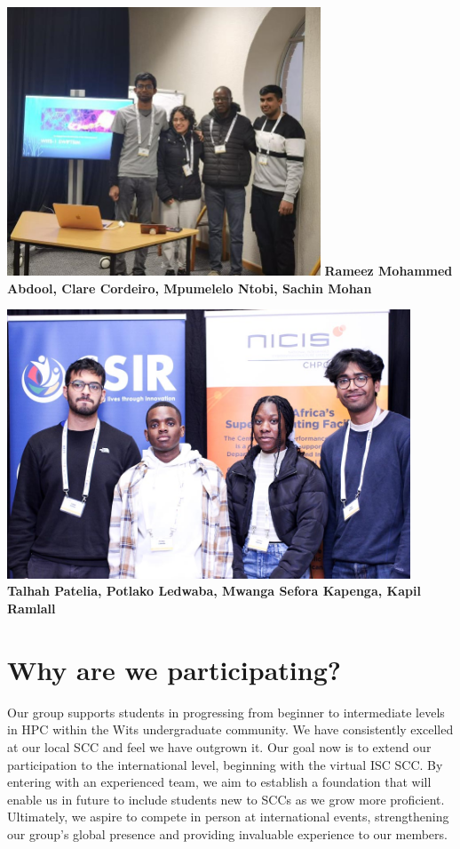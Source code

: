 \documentclass[10pt, onecolumn]{IEEEtran}
\begin{document}
\\\\
\begin{minipage}{0.45\textwidth}
  \centering
  \includegraphics[width=0.7\textwidth]{wits1.jpg}
  \textbf{Rameez Mohammed Abdool, Clare Cordeiro, Mpumelelo Ntobi, Sachin Mohan} 
\end{minipage}
\hspace{0.05\textwidth} %
\begin{minipage}{0.45\textwidth}
  \centering
  \includegraphics[width=0.9\textwidth]{witsa.jpg}
  \textbf{Talhah Patelia, Potlako Ledwaba, Mwanga Sefora Kapenga, Kapil Ramlall} 
\end{minipage}

\section{Why are we participating?}
\noindent
Our group supports students in progressing from beginner to intermediate levels in HPC within the Wits undergraduate community. We have consistently excelled at our local SCC and feel we have outgrown it. Our goal now is to extend our participation to the international level, beginning with the virtual ISC SCC. By entering with an experienced team, we aim to establish a foundation that will enable us in future to include students new to SCCs as we grow more proficient. Ultimately, we aspire to compete in person at international events, strengthening our group's global presence and providing invaluable experience to our members.
\end{document}
